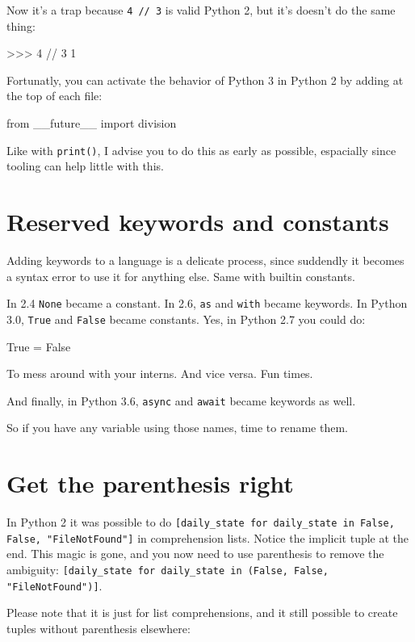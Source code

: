 \begin{py2}
\begin{py2}
\begin{py2and3}
\begin{py2and3}
Now it's a trap because \lstinline{4 // 3} is valid Python 2, but it's doesn't do the same thing:

\begin{py2}
>>> 4 // 3
1
\end{py2}

Fortunatly, you can activate the behavior of Python 3 in Python 2 by adding at the top of each file:

\begin{py2and3}
from __future__ import division
\end{py2and3}

Like with \lstinline{print()}, I advise you to do this as early as possible, espacially since tooling can help little with this.


\section{Reserved keywords and constants}

Adding \glspl{keyword} to a language is a delicate process, since suddendly it becomes a syntax error to use it for anything else. Same with \gls{builtin} constants.

In 2.4 \lstinline{None} became a constant. In 2.6, \lstinline{as} and \lstinline{with} became keywords. In Python 3.0, \lstinline{True} and \lstinline{False} became constants. Yes, in Python 2.7 you could do:

\begin{py2}
True = False
\end{py2}

To mess around with your interns. And vice versa. Fun times.

And finally, in Python 3.6, \lstinline{async} and \lstinline{await} became keywords as well.

So if you have any variable using those names, time to rename them.

\section{Get the parenthesis right}

In Python 2 it was possible to do \lstinline{[daily_state for daily_state in False, False, "FileNotFound"]} in comprehension lists. Notice the implicit tuple at the end. This magic is gone, and you now need to use parenthesis to remove the ambiguity: \lstinline{[daily_state for daily_state in (False, False, "FileNotFound")]}.

Please note that it is just for list comprehensions, and it still possible to create tuples without parenthesis elsewhere:


\end{py2and3}
\end{py2and3}
\end{py2}
\end{py2}
